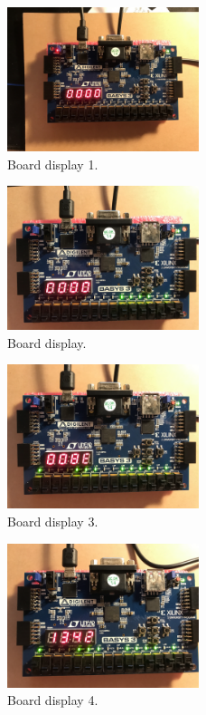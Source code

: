 \documentclass[11pt]{article}
\begin{document}
\begin{figure}[ht]\centering
	\includegraphics[width=0.5\textwidth]{board1}
	\caption{Board display 1.}
	\label{fig:board 1}			%
\end{figure}

\begin{figure}[ht]\centering
	\includegraphics[width=0.5\textwidth]{board2}
	\caption{Board display.}
	\label{fig:board 2}			%
\end{figure}

\begin{figure}[ht]\centering
	\includegraphics[width=0.5\textwidth]{board3}
	\caption{Board display 3.}
	\label{fig:board 3}			%
\end{figure}

\begin{figure}[ht]\centering
	\includegraphics[width=0.5\textwidth]{board4}
	\caption{Board display 4.}
	\label{fig:board 4}			%
\end{figure}
\end{document}
